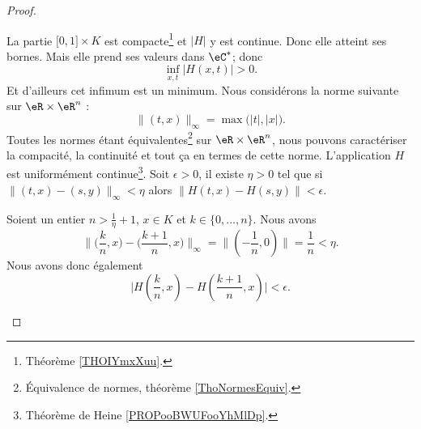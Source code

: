 \begin{proof}
\begin{subproof}
		La partie \( \mathopen[ 0 , 1 \mathclose]\times K\) est compacte\footnote{Théorème \ref{THOIYmxXuu}.} et \( | H |\) y est continue. Donc elle atteint ses bornes. Mais elle prend ses valeurs dans \( \eC^*\); donc
		\begin{equation}
			\inf_{x,t}| H(x,t) |>0.
		\end{equation}
		Et d'ailleurs cet infimum est un minimum. Nous considérons la norme suivante sur \( \eR\times \eR^n\) :
		\begin{equation}
			\| (t,x) \|_{\infty}=\max\big( | t |,| x | \big).
		\end{equation}
		Toutes les normes étant équivalentes\footnote{Équivalence de normes, théorème \ref{ThoNormesEquiv}.} sur \( \eR\times \eR^n\), nous pouvons caractériser la compacité, la continuité et tout ça en termes de cette norme. L'application \( H\) est uniformément continue\footnote{Théorème de Heine \ref{PROPooBWUFooYhMlDp}.}. Soit \( \epsilon>0\), il existe \( \eta>0\) tel que si \( \| (t,x)-(s,y) \|_{\infty}<\eta\) alors \( \| H(t,x)-H(s,y) \|<\epsilon\).

		Soient un entier \( n>\frac{1}{ \eta }+1\), \( x\in K\)  et \( k\in\{ 0,\ldots, n \}\). Nous avons
		\begin{equation}
			\big\| \big(\frac{ k }{ n },x\big)-\big(  \frac{ k+1 }{ n },x \big) \big\|_{\infty}=\big\|  (-\frac{1}{ n },0)  \big\|=\frac{1}{ n }<\eta.
		\end{equation}
		Nous avons donc également
		\begin{equation}
			\big| H(\frac{ k }{ n },x)-H(\frac{ k+1 }{ n },x) \big|<\epsilon.
		\end{equation}


\end{subproof}
\end{proof}
